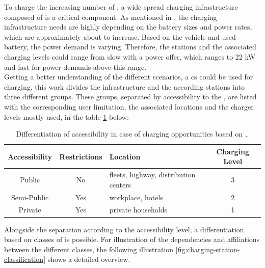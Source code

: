 To charge the increasing number of , a wide spread charging infrastructure composed of  is a critical component. As mentioned in \cite{gnann_fast_2018}, the charging infrastructure needs are highly depending on the battery sizes and power rates, which are approximately about to increase.
Based on the vehicle and used battery, the power demand is varying. Therefore, the stations and the associated charging levels could range from slow  with a power offer, which ranges to 22 \acrshort{kW} and fast  for power demands above this range. \\
\noindent Getting a better understanding of the different scenarios, a \acrshort{cs} could be used for charging, this work divides the infrastructure and the according stations into three different groups. These groups, separated by accessibility to the , are listed with the corresponding user limitation, the associated locations and the charger levels mostly used, in the table \ref{tab:cs-accessibility-levels} below:

\begingroup
\setlength{\tabcolsep}{10pt} %
\renewcommand{\arraystretch}{1.5} %
\begin{table}[h]
\centering
\caption{Differentiation of accessibility in case of charging opportunities based on \cite{kathiresh_e-mobility_2022},\cite[18-19]{linnemann_elektromobilitat_2020}.}
    \begin{tabular}{c|c|m{5.5cm}|c}
    Accessibility & Restrictions & Location & Charging Level \\ \hline
    Public & No & fleets, highway, distribution centers & 3 \\
    Semi-Public & Yes & workplace, hotels & 2 \\
    Private & Yes & private households & 1 
    \end{tabular}
\label{tab:cs-accessibility-levels}
\end{table}
\endgroup

\noindent Alongside the separation according to the accessibility level, a differentiation based on classes of  is possible. For illustration of the dependencies and affiliations between the different classes, the following illustration \ref{fig:charging-station-classification} shows a detailed overview. 

